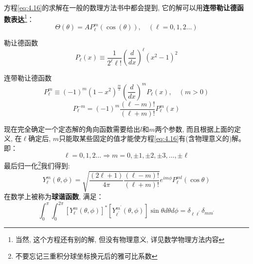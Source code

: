 \documentclass[a4paper,zihao=-4,linespread=1]{ctexrep}
\newenvironment{lequation}{\large\begin{equation}}{\end{equation}}
\begin{document}
    方程\ref{eq:4.16}的求解在一般的数理方法书中都会提到, 它的解可以用\textbf{连带勒让德函数表达}\footnote{当然, 这个方程还有别的解, 但没有物理意义, 详见数学物理方法内容}：
    \begin{equation}
        \Theta(\theta)=AP_\ell^m\left(\cos\left(\theta\right)\right),\quad(\ell=0,1,2\ldots)
    \end{equation}
    \begin{define}{勒让德函数}
        \begin{lequation}
            P_\ell(x)\equiv\frac{1}{2^\ell\ell!}\left(\frac{d}{dx}\right)^\ell\left(x^2-1\right)^2
        \end{lequation}
    \end{define}
    \begin{define}{连带勒让德函数}
        \begin{lequation}
            P_\ell^m\equiv(-1)^m\left(1-x^2\right)^\frac{m}{2}\left(\frac{d}{dx}\right)^mP_\ell(x),\quad(m>0)
        \end{lequation}
        \begin{lequation}
            P_\ell^{-m}=(-1)^m\frac{\left(\ell-m\right)!}{\left(\ell+m\right)!}P_\ell^m(x)
        \end{lequation}
    \end{define}
    现在完全确定一个定态解的角向函数需要给出$l$和$m$两个参数, 而且根据上面的定义, 在$\ell$确定后, $m$只能取某些固定的值才能使方程\ref{eq:4.16}有(含物理意义的)解。即：
    \[\ell=0,1,2\ldots\Rightarrow m=0,\pm 1,\pm 2,\pm 3,\ldots, \pm \ell\]
    最后归一化\footnote{不要忘记三重积分球坐标换元后的雅可比系数}我们得到:
    \begin{lequation}
        \boxed{Y_{\ell}^{m}(\theta, \phi)=\sqrt{\frac{(2 \ell+1)}{4 \pi} \frac{(\ell-m) !}{(\ell+m) !}} e^{i m \phi} P_{\ell}^{m l}(\cos \theta)}
    \end{lequation}
    在数学上被称为\textbf{球谐函数}, 满足：
    \begin{equation}
        \int_{0}^{\pi} \int_{0}^{2 \pi}\left[Y_{\ell}^{m}(\theta, \phi)\right]^{*}\left[Y_{\ell^{\prime}}^{m^{\prime}}(\theta, \phi)\right] \sin \theta d \theta d \phi=\delta_{\ell \ell^{\prime}} \delta_{m m^{\prime}}
    \end{equation}
\end{document}
